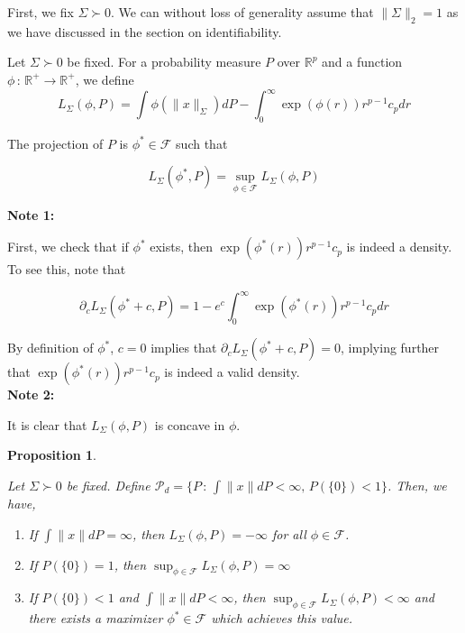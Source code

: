 \documentclass[12pt]{article}
\newtheorem{proposition}[theorem]{Proposition}
\newenvironment{definition}[1][Definition]{\begin{trivlist}
\item[\hskip \labelsep {\bfseries #1}]}{\end{trivlist}}
\begin{document}
First, we fix $\Sigma \succ 0$. We can without loss of generality assume that $\| \Sigma \|_2 = 1$ as we have discussed in the section on identifiability.

\begin{definition}
Let $\Sigma \succ 0$ be fixed. For a probability measure $P$ over $\mathbb{R}^p$ and a function $\phi \,:\, \mathbb{R}^+ \rightarrow \mathbb{R}^+$, we define
\[
L_\Sigma(\phi, P) = \int \phi(\| x \|_{\Sigma} ) dP - \int_0^{\infty} \exp( \phi(r) ) r^{p-1} c_p dr
\]

The projection of $P$ is $\phi^* \in \mathcal{F}$ such that

\[
L_{\Sigma}(\phi^*, P) = \sup_{\phi \in \mathcal{F}} L_{\Sigma}(\phi, P)
\]
\end{definition}

\textbf{Note 1:}

First, we check that if $\phi^*$ exists, then $\exp( \phi^*(r) ) r^{p-1} c_p$ is indeed a density. To see this, note that 

\[
\partial_c L_{\Sigma}(\phi^* + c, P) = 1 - e^c \int_0^\infty \exp( \phi^*(r)) r^{p-1} c_p dr
\]

By definition of $\phi^*$, $c=0$ implies that $\partial_c L_{\Sigma} (\phi^* + c, P) = 0$, implying further that $\exp(\phi^*(r)) r^{p-1} c_p$ is indeed a valid density. \\

\textbf{Note 2:}

It is clear that $L_{\Sigma}(\phi, P)$ is concave in $\phi$. \\


\begin{proposition}
\label{prop:projection_existence}

Let $\Sigma \succ 0$ be fixed. Define $\mathcal{P}_d = \{ P \,:\, \int \|x\| dP < \infty,\, P(\{0\}) < 1 \}$. Then, we have,

\begin{enumerate}
\item If $\int \|x\| dP = \infty$, then $L_{\Sigma}(\phi, P) = - \infty$ for all $\phi \in \mathcal{F}$. 
\item If $P(\{0\}) = 1$, then $\sup_{\phi \in \mathcal{F}} L_{\Sigma}(\phi, P) = \infty$ 
\item If $P(\{0\}) < 1$ and $\int \|x \| dP < \infty$, then $\sup_{\phi \in \mathcal{F}} L_{\Sigma}(\phi, P) < \infty$ and there exists a maximizer $\phi^* \in \mathcal{F}$ which achieves this value.
\end{enumerate}

\end{proposition}
\end{document}
